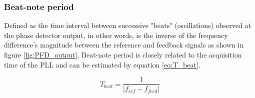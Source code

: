 \subsubsection{Beat-note period}
Defined as the time interval between successive "beats" (oscillations) observed at the phase detector output, in other words, is the inverse of
the frequency difference's magnitude between the reference and feedback signals as shown in figure \ref{fig:PFD_output}. Beat-note period is closely related to the acquisition time of the
PLL and can be estimated by equation \eqref{eq:T_beat}. 

\begin{equation}
    T_{beat} = \frac{1}{|f_{ref} - f_{feed}|}
    \label{eq:T_beat}
\end{equation}


\begin{minipage}{0.35\textwidth}
    \begin{center}
        \label{fig:PFD_block}
    \end{center}
\end{minipage}
\hspace{0.13\textwidth}

